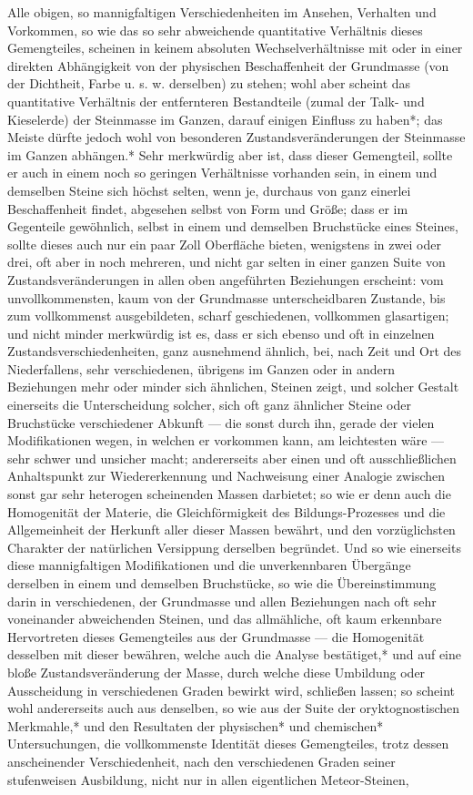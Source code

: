 \documentclass[a4paper, 11pt, oneside, german]{article}
\begin{document}
Alle obigen, so mannigfaltigen Verschiedenheiten im Ansehen, Verhalten und Vorkommen, so wie das so sehr abweichende quantitative Verhältnis dieses Gemengteiles, scheinen in keinem absoluten Wechselverhältnisse mit oder in einer direkten Abhängigkeit von der physischen Beschaffenheit der Grundmasse (von der Dichtheit, Farbe u. s. w. derselben) zu stehen; wohl aber scheint das quantitative Verhältnis der entfernteren Bestandteile (zumal der Talk- und Kieselerde) der Steinmasse im Ganzen, darauf einigen Einfluss zu haben*; das Meiste dürfte jedoch wohl von besonderen Zustandsveränderungen der Steinmasse im Ganzen abhängen.* Sehr merkwürdig aber ist, dass dieser Gemengteil, sollte er auch in einem noch so geringen Verhältnisse vorhanden sein, in einem und demselben Steine sich höchst selten, wenn je, durchaus von ganz einerlei Beschaffenheit findet, abgesehen selbst von Form und Größe; dass er im Gegenteile gewöhnlich, selbst in einem und demselben Bruchstücke eines Steines, sollte dieses auch nur ein paar Zoll Oberfläche bieten, wenigstens in zwei oder drei, oft aber in noch mehreren, und nicht gar selten in einer ganzen Suite von Zustandsveränderungen in allen oben angeführten Beziehungen erscheint: vom unvollkommensten, kaum von der Grundmasse unterscheidbaren Zustande, bis zum vollkommenst ausgebildeten, scharf geschiedenen, vollkommen glasartigen; und nicht minder merkwürdig ist es, dass er sich ebenso und oft in einzelnen Zustandsverschiedenheiten, ganz ausnehmend ähnlich, bei, nach Zeit und Ort des Niederfallens, sehr verschiedenen, übrigens im Ganzen oder in andern Beziehungen mehr oder minder sich ähnlichen, Steinen zeigt, und solcher Gestalt einerseits die Unterscheidung solcher, sich oft ganz ähnlicher Steine oder Bruchstücke verschiedener Abkunft --- die sonst durch ihn, gerade der vielen Modifikationen wegen, in welchen er vorkommen kann, am leichtesten wäre --- sehr schwer und unsicher macht; andererseits aber einen und oft ausschließlichen Anhaltspunkt zur Wiedererkennung und Nachweisung einer Analogie zwischen sonst gar sehr heterogen scheinenden Massen darbietet; so wie er denn auch die Homogenität der Materie, die Gleichförmigkeit des Bildungs-Prozesses und die Allgemeinheit der Herkunft aller dieser Massen bewährt, und den vorzüglichsten Charakter der natürlichen Versippung derselben begründet. Und so wie einerseits diese mannigfaltigen Modifikationen und die unverkennbaren Übergänge derselben in einem und demselben Bruchstücke, so wie die Übereinstimmung darin in verschiedenen, der Grundmasse und allen Beziehungen nach oft sehr voneinander abweichenden Steinen, und das allmähliche, oft kaum erkennbare Hervortreten dieses Gemengteiles aus der Grundmasse --- die Homogenität desselben mit dieser bewähren, welche auch die Analyse bestätiget,* und auf eine bloße Zustandsveränderung der Masse, durch welche diese Umbildung oder Ausscheidung in verschiedenen Graden bewirkt wird, schließen lassen; so scheint wohl andererseits auch aus denselben, so wie aus der Suite der oryktognostischen Merkmahle,* und den Resultaten der physischen* und chemischen* Untersuchungen, die vollkommenste Identität dieses Gemengteiles, trotz dessen anscheinender Verschiedenheit, nach den verschiedenen Graden seiner stufenweisen Ausbildung, nicht nur in allen eigentlichen Meteor-Steinen, 
\end{document}
